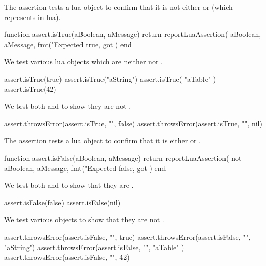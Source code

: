 \stopTestSuite


The  assertion tests a lua object to confirm that it 
is not either  or  (which represents  
in lua). 

\startLuaCode
function assert.isTrue(aBoolean, aMessage)
  return reportLuaAssertion(
    aBoolean,
    aMessage,
    fmt("Expected true, got %
  )
end
\stopLuaCode


We test various lua objects which are neither  nor . 

\startLuaTest
  assert.isTrue(true)
  assert.isTrue("aString")
  assert.isTrue({ "aTable" })
  assert.isTrue(42)
\stopLuaTest
\stopTestCase


We test both  and  to show they are not 
. 

\startLuaTest
  assert.throwsError(assert.isTrue, "", false)
  assert.throwsError(assert.isTrue, "", nil)
\stopLuaTest
\stopTestCase

\stopTestSuite


The  assertion tests a lua object to confirm that it 
is either  or . 

\startLuaCode
function assert.isFalse(aBoolean, aMessage)
  return reportLuaAssertion(
    not aBoolean,
    aMessage,
    fmt("Expected false, got %
  )
end
\stopLuaCode


We test both  and  to show that they are 
. 

\startLuaTest
  assert.isFalse(false)
  assert.isFalse(nil)
\stopLuaTest
\stopTestCase


We test various objects to show that they are not .

\startLuaTest
  assert.throwsError(assert.isFalse, "", true)
  assert.throwsError(assert.isFalse, "", "aString")
  assert.throwsError(assert.isFalse, "", { "aTable" })
  assert.throwsError(assert.isFalse, "", 42)
\stopLuaTest
\stopTestCase

